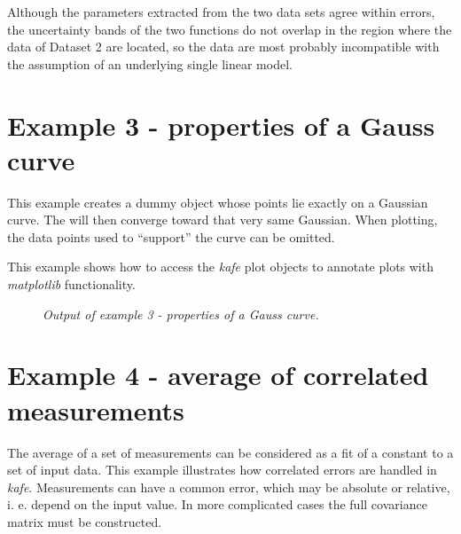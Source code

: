 \documentclass[a4paper,10pt,english]{sphinxmanual}
\begin{document}
Although the parameters extracted from the two data sets agree within
errors, the uncertainty bands of the two functions do not overlap
in the region where the data of Dataset 2 are located, so the data
are most probably incompatible with the assumption of an underlying
single linear model.


\section{Example 3 - properties of a Gauss curve}
\label{index:example-3-properties-of-a-gauss-curve}
This example creates a dummy  object whose points lie exactly
on a Gaussian curve. The  will then converge toward that very same
Gaussian. When plotting, the data points used to ``support'' the curve
can be omitted.

This example shows how to access the \emph{kafe} plot objects
to annotate plots with \emph{matplotlib} functionality.
\begin{figure}[htbp]
\centering
\capstart

\caption{\emph{Output of example 3 - properties of a Gauss curve.}}\end{figure}


\section{Example 4 - average of correlated measurements}
\label{index:example-4-average-of-correlated-measurements}
The average of a set of measurements can be considered as a fit
of a constant to a set of input data. This example illustrates
how correlated errors are handled in \emph{kafe}.
Measurements can have a common error, which may be absolute
or relative, i. e. depend on the input value.  In more complicated
cases the full covariance matrix must be constructed.
\end{document}
